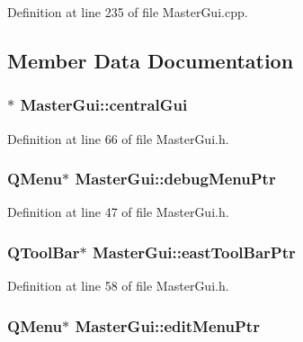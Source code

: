 Definition at line 235 of file Master\-Gui.\-cpp.



\subsection{Member Data Documentation}
\hypertarget{class_master_gui_a565fc5a3622b8b5417b26dd1306439b8}{
\subsubsection[{central\-Gui}]{$\ast$ Master\-Gui\-::central\-Gui\hspace{0.3cm}{\ttfamily [private]}}}\label{class_master_gui_a565fc5a3622b8b5417b26dd1306439b8}


Definition at line 66 of file Master\-Gui.\-h.

\hypertarget{class_master_gui_ac1efdb45cdde47584625a8026166c316}{
\subsubsection[{debug\-Menu\-Ptr}]{\setlength{\rightskip}{0pt plus 5cm}Q\-Menu$\ast$ Master\-Gui\-::debug\-Menu\-Ptr\hspace{0.3cm}{\ttfamily [private]}}}\label{class_master_gui_ac1efdb45cdde47584625a8026166c316}


Definition at line 47 of file Master\-Gui.\-h.

\hypertarget{class_master_gui_a289b4db70744b812566a689bf368c37c}{
\subsubsection[{east\-Tool\-Bar\-Ptr}]{\setlength{\rightskip}{0pt plus 5cm}Q\-Tool\-Bar$\ast$ Master\-Gui\-::east\-Tool\-Bar\-Ptr\hspace{0.3cm}{\ttfamily [private]}}}\label{class_master_gui_a289b4db70744b812566a689bf368c37c}


Definition at line 58 of file Master\-Gui.\-h.

\hypertarget{class_master_gui_aeb708f257518fb47d567d1130bfc7f7f}{
\subsubsection[{edit\-Menu\-Ptr}]{\setlength{\rightskip}{0pt plus 5cm}Q\-Menu$\ast$ Master\-Gui\-::edit\-Menu\-Ptr\hspace{0.3cm}{\ttfamily [private]}}}\label{class_master_gui_aeb708f257518fb47d567d1130bfc7f7f}


